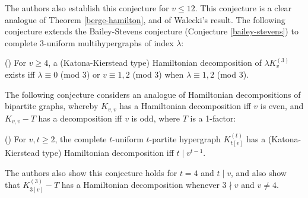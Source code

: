 The authors also establish this conjecture for $v \leq 12$. This conjecture is a
clear analogue of Theorem \ref{berge-hamilton}, and of Walecki's result. The
following conjecture extends the Bailey-Stevens conjecture (Conjecture
\ref{bailey-stevens}) to complete $3$-uniform multihypergraphs of index $\lambda$:

\begin{conjecture} (\cite{mesz-rosa})
For $v \geq 4$, a (Katona-Kierstead type) Hamiltonian decomposition of
$\lambda K_v^{(3)}$ exists iff $\lambda \equiv 0$ (mod $3$) or $v \equiv 1, 2$
(mod $3$) when $\lambda \equiv 1,2$ (mod $3$).
\end{conjecture}

The following conjecture considers an analogue of
Hamiltonian decompositions of bipartite graphs, whereby $K_{v,v}$ has a
Hamiltonian decomposition iff $v$ is even, and $K_{v,v} - T$ has a
decomposition iff $v$ is odd, where $T$ is a 1-factor:

\begin{conjecture} (\cite{kuhl-schr})
For $v, t \geq 2$, the complete $t$-uniform $t$-partite hypergraph
$K_{t[v]}^{(t)}$ has a (Katona-Kierstead type) Hamiltonian decomposition iff
$t \mid v^{t-1}$.
\end{conjecture}

The authors also show this conjecture holds for $t = 4$ and $t \mid v$, and
also show that $K_{3[v]}^{(3)} - T$ has a Hamiltonian decomposition
whenever $3 \nmid v$ and $v \neq 4$.
